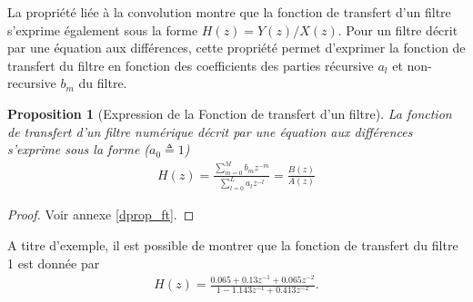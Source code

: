 \documentclass[11pt,a4paper]{IEEEtran}
\newtheorem{proposition}{Proposition}
\begin{document}
La propriété liée à la convolution montre que la fonction de transfert d'un filtre s'exprime également sous la forme $H(z)=Y(z)/X(z)$. Pour un filtre décrit par une équation aux différences, cette propriété permet d'exprimer la fonction de transfert du filtre en fonction des coefficients des parties récursive $a_l$ et non-recursive $b_m$ du filtre.
\begin{proposition}[Expression de la Fonction de transfert d'un filtre] La fonction de transfert d'un filtre numérique décrit par une équation aux différences s'exprime sous la forme ($a_0\triangleq 1$)
\begin{align*}
H(z)=\frac{\sum_{m=0}^{M}b_m z^{-m}}{\sum_{l=0}^{L}a_l z^{-l}}=\frac{B(z)}{A(z)}
\end{align*}\label{prop_ft}
\end{proposition}
\begin{proof}
Voir annexe \ref{dprop_ft}.
\end{proof}

A titre d'exemple, il est possible de montrer que la fonction de transfert du filtre 1 est donnée par 
\begin{align}
H(z)=\frac{0.065+0.13 z^{-1}+0.065z^{-2}}{1-1.143z^{-1}+0.413z^{-2}}.
\end{align}
%
\end{document}
